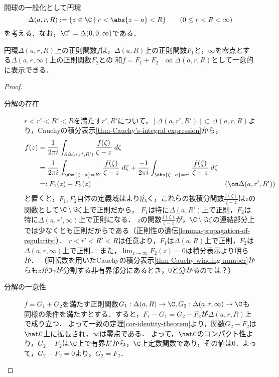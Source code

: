 \documentclass[uplatex, dvipdfmx]{jsreport}
\begin{document}
\begin{notation}
    開球の一般化として円環
    \[\Delta(a,r,R):=\{z\in\C\mid r<\abs{z-a}<R\}\qquad(0\le r<R<\infty)\]
    を考える．なお，$\C^*=\Delta(0,0,\infty)$である．
\end{notation}

\begin{theorem}[正則関数の円環上での分解]\label{thm-decomposition-of-holomorphic-function}
    円環$\Delta(a,r,R)$上の正則関数$f$は，$\Delta(a,R)$上の正則関数$F_1$と，$\infty$を零点とする$\Delta(a,r,\infty)$上の正則関数$F_2$との
    和$f=F_1+F_2\quad\mathrm{on}\;\Delta(a,r,R)$として一意的に表示できる．
\end{theorem}
\begin{proof}\mbox{}
    \begin{description}
        \item[分解の存在] 
        $r<r'<R'<R$を満たす$r',R'$について，$[\Delta(a,r',R')]\subset\Delta(a,r,R)$より，Cauchyの積分表示\ref{thm-Cauchy's-integral-expression}から，
        \begin{align*}
            f(z)&=\frac{1}{2\pi i}\int_{\partial\Delta(a,r',R')}\frac{f(\zeta)}{\zeta-z}\;d\zeta\\
            &=\frac{1}{2\pi i}\int_{\abs{\zeta-a}=R'}\frac{f(\zeta)}{\zeta-z}\;d\zeta+\frac{-1}{2\pi i}\int_{\abs{\zeta-a}=r'}\frac{f(\zeta)}{\zeta-z}\;d\zeta\\
            &=:F_1(z)+F_2(z)&(\on\Delta(a,r',R'))
        \end{align*}
        と置くと，$F_1,F_2$自体の定義域はより広く，これらの被積分関数$\frac{f(\zeta)}{\zeta-z}$は$z$の関数として$\C\setminus\Im\zeta$上で正則だから，
        $F_1$は特に$\Delta(a,R')$上で正則，$F_2$は特に$\Delta(a,r',\infty)$上で正則になる．
        $z$の関数$\frac{f(\zeta)}{\zeta-z}$が，$\C\setminus\Im\zeta$の連結部分上では少なくとも正則だからである（正則性の遺伝\ref{lemma-propagation-of-regularity}）．
        $r<r'<R'<R$は任意より，$F_1$は$\Delta(a,R)$上で正則，$F_2$は$\Delta(a,r,\infty)$上で正則．
        また，$\lim_{z\to\infty}F_2(z)=0$は積分表示より明らか．
        （回転数を用いたCauchyの積分表示\ref{thm-Cauchy-winding-number}からも$z$が$\Im\gamma$が分割する非有界部分にあるとき，$0$と分かるのでは？）
        \item[分解の一意性]
        $f=G_1+G_2$を満たす正則関数$G_1:\Delta(a,R)\to\C,G_2:\Delta(a,r,\infty)\to\C$も
        同様の条件を満たすとする．すると，$F_1-G_1=G_2-F_2$が$\Delta(a,r,R)$上で成り立つ．
        よって一致の定理\ref{cor-identity-theorem}より，関数$G_2-F_2$は$\hatC$上に拡張され，$\infty$は零点である．
        よって，$\hatC$のコンパクト性より，$G_2-F_2$は$\C$上で有界だから，$\C$上定数関数であり，その値は$0$．よって，$G_2-F_2=0$より，$G_2=F_2$．
    \end{description}
\end{proof}
\end{document}

